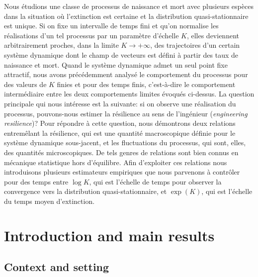 \documentclass[JEP,XML,SOM,Unicode]{cedram}
\numberwithin{equation}{section}
\theoremstyle{plain}
\theoremstyle{definition}
\begin{document}
\begin{altabstract}
Nous étudions une classe de processus de naissance et mort avec plusieurs espèces dans la situation où l'extinction est certaine et la distribution quasi-stationnaire est unique. Si on fixe un intervalle de temps fini et qu'on normalise les réalisations d'un tel processus par un paramètre d'échelle $K$, elles deviennent arbitrairement proches, dans la limite $K\to+\infty$, des trajectoires d'un certain système dynamique dont le champ de vecteurs est défini à partir des taux de naissance et mort. Quand le système dynamique admet un seul point fixe attractif, nous avons précédemment analysé le comportement du processus pour des valeurs de $K$ finies et pour des temps finis, c'est-à-dire le comportement intermédiaire entre les deux comportements limites évoqués ci-dessus. La question principale qui nous intéresse est la suivante: si on observe une réalisation du processus, pouvons-nous estimer la résilience au sens de l'ingénieur (\emph{engineering resilience})? Pour répondre à cette question, nous démontrons deux relations entremêlant la résilience, qui est une quantité macroscopique définie pour le système dynamique sous-jacent, et les fluctuations du processus, qui sont, elles, des quantités microscopiques. De tels genres de relations sont bien connus en mécanique statistique hors d'équilibre. Afin d'exploiter ces relations nous introduisons plusieurs estimateurs empiriques que nous parvenons à contrôler pour des temps entre $\log K$, qui est l'échelle de temps pour observer la convergence vers la distribution quasi-stationnaire, et $\exp(K)$, qui est l'échelle du temps moyen d'extinction.
\end{altabstract}
\maketitle
\tableofcontents

\mainmatter

\section{Introduction and main results}\label{sec:intro}

\subsection{Context and setting}
\end{document}
